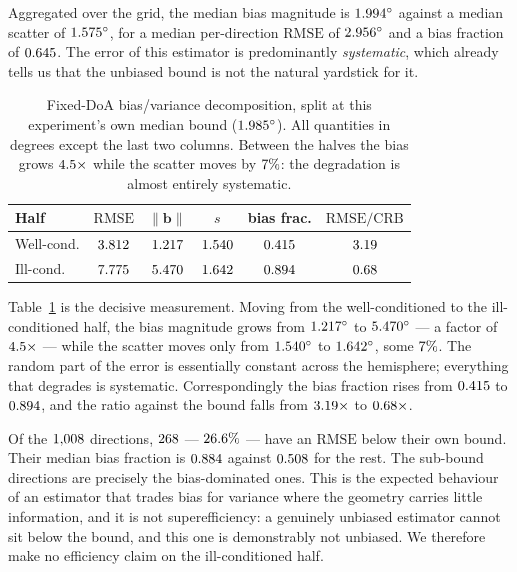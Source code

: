 \documentclass[journal]{IEEEtran}
\newcommand{\CRB}{\mathrm{CRB}}
\newcommand{\RMSE}{\mathrm{RMSE}}
\newcommand{\degs}{^\circ}
\begin{document}
Aggregated over the grid, the median bias magnitude is $\fdBiasMed\degs$
against a median scatter of $\fdScatMed\degs$, for a median per-direction
$\RMSE$ of $\fdRmseMed\degs$ and a bias fraction of $0.645$. The error
of this estimator is predominantly \emph{systematic}, which already tells us
that the unbiased bound is not the natural yardstick for it.

\begin{table}[!t]
\centering
\caption{Fixed-DoA bias/variance decomposition, split at this experiment's own
median bound ($\fdSplit\degs$). All quantities in degrees except the last two
columns. Between the halves the bias grows $4.5\times$ while the
scatter moves by $7\%$: the degradation is almost entirely
systematic.}
\label{tab:biasvar}
\small
\setlength{\tabcolsep}{4pt}
\begin{tabular}{@{}lccccc@{}}
\toprule
Half & $\RMSE$ & $\|\mathbf{b}\|$ & $s$ & bias frac. & $\RMSE/\CRB$ \\
\midrule
Well-cond. & $3.812$ & $1.217$ & $1.540$ & $0.415$ & $3.19$ \\
Ill-cond.  & $7.775$  & $5.470$  & $1.642$  & $0.894$  & $0.68$ \\
\bottomrule
\end{tabular}
\end{table}

Table~\ref{tab:biasvar} is the decisive measurement. Moving from the
well-conditioned to the ill-conditioned half, the bias magnitude grows from
$\fdWellBias\degs$ to $\fdIllBias\degs$ --- a factor of
$4.5\times$ --- while the scatter moves only from
$\fdWellScat\degs$ to $\fdIllScat\degs$, some $7\%$. The random
part of the error is essentially constant across the hemisphere; everything
that degrades is systematic. Correspondingly the bias fraction rises from
$0.415$ to $0.894$, and the ratio against the bound falls from
$3.19\times$ to $0.68\times$.

Of the $1{,}008$ directions, $268$ --- $26.6\%$ --- have an $\RMSE$
below their own bound. Their median bias fraction is $0.884$ against
$0.508$ for the rest. The sub-bound directions are precisely the
bias-dominated ones. This is the expected behaviour of an estimator that
trades bias for variance where the geometry carries little information, and it
is not superefficiency: a genuinely unbiased estimator cannot sit below the
bound, and this one is demonstrably not unbiased. We therefore make no
efficiency claim on the ill-conditioned half.
\end{document}
